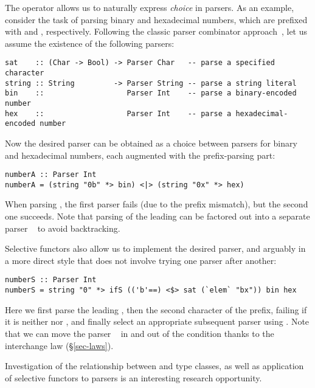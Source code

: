 \noindent
The operator \hs{<|>} allows us to naturally express \emph{choice} in parsers.
As an example, consider the task of parsing binary and hexadecimal numbers,
which are prefixed with  and , respectively. Following the
classic parser combinator approach~\citep{hutton1998monadic}, let us assume the
existence of the following parsers:

\vspace{1mm}
\begin{verbatim}
sat    :: (Char -> Bool) -> Parser Char   -- parse a specified character
string :: String         -> Parser String -- parse a string literal
bin    ::                   Parser Int    -- parse a binary-encoded number
hex    ::                   Parser Int    -- parse a hexadecimal-encoded number
\end{verbatim}
\vspace{1mm}

\noindent
Now the desired parser can be obtained as a choice between parsers for binary
and hexadecimal numbers, each augmented with the prefix-parsing part:

\vspace{1mm}
\begin{verbatim}
numberA :: Parser Int
numberA = (string "0b" *> bin) <|> (string "0x" *> hex)
\end{verbatim}
\vspace{1mm}

\noindent
When parsing , the first parser fails (due to the prefix mismatch),
but the second one succeeds. Note that parsing of the leading  can be
factored out into a separate parser ~ to avoid backtracking.

Selective functors also allow us to implement the desired parser, and arguably
in a more direct style that does not involve trying one parser after another:

\vspace{1mm}
\begin{verbatim}
numberS :: Parser Int
numberS = string "0" *> ifS (('b'==) <$> sat (`elem` "bx")) bin hex
\end{verbatim}
\vspace{1mm}

\noindent
Here we first parse the leading , then the second character of the
prefix, failing if it is neither  nor , and finally select an
appropriate subsequent parser using . Note that we can move the parser
~ in and out of the condition  thanks to the
interchange law (\S\ref{sec-laws}).

Investigation of the relationship between  and 
type classes, as well as application of selective functors to parsers is an
interesting research opportunity.
